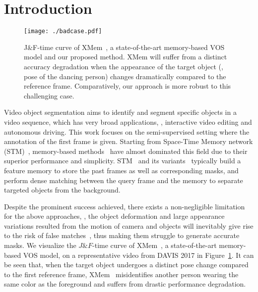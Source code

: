 \documentclass[10pt,twocolumn,letterpaper]{article}
\begin{document}
\section{Introduction}
\label{sec:intro}
\begin{figure}[t]
  \centering
   \texttt{[image: ./badcase.pdf]}
   \vspace{-0.15in}
   \caption{J$\&$F-time curve of XMem~\cite{cheng2022xmem}, a state-of-the-art memory-based VOS model and our proposed method. XMem will suffer from a distinct accuracy degradation when the appearance of the target object (\eg, pose of the dancing person) changes dramatically compared to the reference frame. Comparatively, our approach is more robust to this challenging case.}
   \label{fig:badcase}
\end{figure}

Video object segmentation aims to identify and segment specific objects in a video sequence, which has very broad applications, \eg, interactive video editing and autonomous driving. This work focuses on the semi-supervised setting where the annotation of the first frame is given. Starting from Space-Time Memory network (STM)~\cite{oh2019video}, memory-based methods~\cite{liang2020video,lu2020video,cheng2021mivos,hu2021learning,seong2021hierarchical,cheng2021stcn,wang2021swiftnet,park2022per,cheng2022xmem} have almost dominated this field due to their superior performance and simplicity. STM~\cite{oh2019video} and its variants~\cite{li2020fast,xie2021efficient,hu2021learning} typically build a feature memory to store the past frames as well as corresponding masks, and perform dense matching between the query frame and the memory to separate targeted objects from the background.

Despite the prominent success achieved, there exists a non-negligible limitation for the above approaches, \ie, the object deformation and large appearance variations resulted from the motion of camera and objects will inevitably give rise to the risk of false matches~\cite{oh2019video,cheng2021stcn,cheng2022xmem}, thus making them struggle to generate accurate masks. We visualize the $J\&F$-time curve of XMem~\cite{cheng2022xmem}, a state-of-the-art memory-based VOS model, on a representative video from DAVIS 2017 in Figure~\ref{fig:badcase}. It can be seen that, when the target object undergoes a distinct pose change compared to the first reference frame, XMem~\cite{cheng2022xmem} misidentifies another person wearing the same color as the foreground and suffers from drastic performance degradation. 
\end{document}
